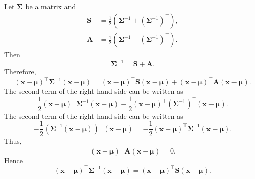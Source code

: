 \subsection{}
\label{2.17}
Let $\bm{\Sigma}$ be a matrix and
%
\begin{equation}
\begin{aligned}
\mathbf{S} 
&=
\frac{1}{2} 
\left( 
	\bm{\Sigma} ^ {- 1} 
	+ 
	\left( 
		\bm{\Sigma} ^ {- 1} 
	\right) ^ \intercal 
\right), 
\\
\mathbf{A} 
&= 
\frac{1}{2} 
\left( 
	\bm{\Sigma} ^ {- 1} 
	- 
	\left( 
		\bm{\Sigma} ^ {- 1} 
	\right) ^ \intercal 
\right).
\end{aligned}
\end{equation}
%
Then
%
\begin{equation}
\bm{\Sigma} ^ {- 1} 
= 
\mathbf{S} 
+ 
\mathbf{A}.
\end{equation}
%
Therefore,
%
\begin{equation}
(\mathbf{x} - \bm{\mu}) ^ \intercal 
\bm{\Sigma} ^ {-1} 
(\mathbf{x} - \bm{\mu})
= 
(\mathbf{x} - \bm{\mu}) ^ \intercal 
\mathbf{S} 
(\mathbf{x} - \bm{\mu}) 
+ 
(\mathbf{x} - \bm{\mu}) ^ \intercal 
\mathbf{A} 
(\mathbf{x} - \bm{\mu}).
\end{equation}
%
The second term of the right hand side can be written as
%
\begin{equation}
\frac{1}{2} 
(\mathbf{x} - \bm{\mu}) ^ \intercal 
\bm{\Sigma} ^ {- 1} 
(\mathbf{x} - \bm{\mu}) 
- 
\frac{1}{2} 
(\mathbf{x} - \bm{\mu}) ^ \intercal 
\left( 
	\bm{\Sigma} ^ {- 1} 
\right) ^ \intercal 
(\mathbf{x} - \bm{\mu}).
\end{equation}
%
The second term of the right hand side can be written as
%
\begin{equation}
- 
\frac{1}{2} 
\left( 
	\bm{\Sigma} ^ {- 1} 
	(\mathbf{x} - \bm{\mu}) 
\right) ^ \intercal 
(\mathbf{x} - \bm{\mu})
= 
- 
\frac{1}{2} 
(\mathbf{x} - \bm{\mu}) ^ \intercal 
\bm{\Sigma} ^ {- 1} 
(\mathbf{x} - \bm{\mu}).
\end{equation}
%
Thus,
%
\begin{equation}
(\mathbf{x} - \bm{\mu}) ^ \intercal 
\mathbf{A} 
(\mathbf{x} - \bm{\mu}) 
= 
0.
\end{equation}
%
Hence
%
\begin{equation}
(\mathbf{x} - \bm{\mu}) ^ \intercal 
\bm{\Sigma} ^ {- 1} 
(\mathbf{x} - \bm{\mu})
= 
(\mathbf{x} - \bm{\mu}) ^ \intercal 
\mathbf{S} 
(\mathbf{x} - \bm{\mu}).
\end{equation}
%



